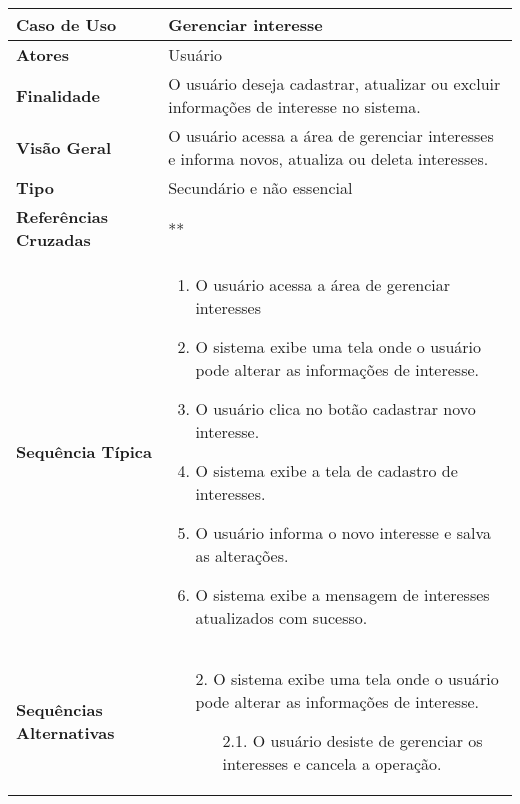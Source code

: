 \documentclass[a4paper,11pt]{article}
\begin{document}
\begin{table}[H]
		\begin{tabularx}{\textwidth}{|l|X|}
		\hline
			\textbf{Caso de Uso} &  Gerenciar interesse \\ \hline
			\textbf{Atores} & Usuário   \\ \hline
			\textbf{Finalidade} & O usuário deseja cadastrar, atualizar ou excluir informações de interesse no sistema.  \\ \hline
			\textbf{Visão Geral} &  O usuário acessa a área de gerenciar interesses e informa novos, atualiza ou deleta interesses. \\ \hline
			\textbf{Tipo} & Secundário e não essencial \\ \hline
			\textbf{Referências Cruzadas} & ** \\ \hline
			\textbf{Sequência Típica} & 
			\begin{enumerate}
			\item O usuário acessa a área de gerenciar interesses
			\item O sistema exibe uma tela onde o usuário pode alterar as informações de interesse.	
			\item O usuário clica no botão cadastrar novo interesse.
			\item O sistema exibe a tela de cadastro de interesses.
			\item O usuário informa o novo interesse e salva as alterações.
			\item O sistema exibe a mensagem de interesses atualizados com sucesso.
			\end{enumerate} \\ \hline
			
			\textbf{Sequências Alternativas} & 
			\begin{itemize}
				\item[2.] O sistema exibe uma tela onde o usuário pode alterar as informações de interesse.
				\begin{itemize}
					\item[2.1.] O usuário desiste de gerenciar os interesses e cancela a operação.
				\end{itemize}
			\end{itemize} \\ \hline
		\end{tabularx}
\end{table}
\end{document}
